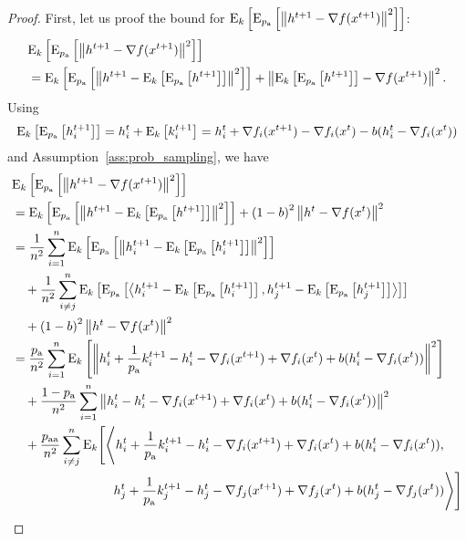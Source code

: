 \documentclass{article}
\newcommand*{\probavailable}{\ensuremath{p_{\textnormal{a}}}}
\newcommand*{\probpairaa}{\ensuremath{p_{\textnormal{aa}}}}
\begin{document}
\begin{proof}
  First, let us proof the bound for $\ExpSub{k}{\ExpSub{\probavailable}{\norm{h^{t+1} - \nabla f(x^{t+1})}^2}}$:
  \begin{align*}
      &\ExpSub{k}{\ExpSub{\probavailable}{\norm{h^{t+1} - \nabla f(x^{t+1})}^2}} \\
      &=\ExpSub{k}{\ExpSub{\probavailable}{\norm{h^{t+1} - \ExpSub{k}{\ExpSub{\probavailable}{h^{t+1}}}}^2}} + \norm{\ExpSub{k}{\ExpSub{\probavailable}{h^{t+1}}} - \nabla f(x^{t+1})}^2.
  \end{align*}
  Using
  \begin{align*}
      \ExpSub{k}{\ExpSub{\probavailable}{h^{t+1}_i}} = h^{t}_i + \ExpSub{k}{k^{t+1}_i} = h^{t}_i + \nabla f_i(x^{t+1}) - \nabla f_i(x^{t}) - b(h^t_i - \nabla f_i(x^{t}))
  \end{align*}
  and Assumption~\ref{ass:prob_sampling}, we have
  \begin{align*}
      &\ExpSub{k}{\ExpSub{\probavailable}{\norm{h^{t+1} - \nabla f(x^{t+1})}^2}} \\
      &=\ExpSub{k}{\ExpSub{\probavailable}{\norm{h^{t+1} - \ExpSub{k}{\ExpSub{\probavailable}{h^{t+1}}}}^2}} + \left(1 - b\right)^2 \norm{h^{t} - \nabla f(x^{t})}^2\\
      &=\frac{1}{n^2}\sum_{i=1}^n \ExpSub{k}{\ExpSub{\probavailable}{\norm{h^{t+1}_i - \ExpSub{k}{\ExpSub{\probavailable}{h^{t+1}_i}}}^2}} \\
      &\quad+ \frac{1}{n^2}\sum_{i\neq j}^n \ExpSub{k}{\ExpSub{\probavailable}{\inp{h^{t+1}_i - \ExpSub{k}{\ExpSub{\probavailable}{h^{t+1}_i}}}{h^{t+1}_j - \ExpSub{k}{\ExpSub{\probavailable}{h^{t+1}_j}}}}} \\
      &\quad + \left(1 - b\right)^2 \norm{h^{t} - \nabla f(x^{t})}^2 \\
      &=\frac{\probavailable}{n^2}\sum_{i=1}^n \ExpSub{k}{\norm{h^{t}_i + \frac{1}{\probavailable}k^{t+1}_i - h^{t}_i - \nabla f_i(x^{t+1}) + \nabla f_i(x^{t}) + b(h^t_i - \nabla f_i(x^{t}))}^2} \\
      &\quad + \frac{1 - \probavailable}{n^2}\sum_{i=1}^n \norm{h^{t}_i - h^{t}_i - \nabla f_i(x^{t+1}) + \nabla f_i(x^{t}) + b(h^t_i - \nabla f_i(x^{t}))}^2 \\
      &\quad +\frac{\probpairaa}{n^2}\sum_{i \neq j}^n{\rm E}_{k}\Bigg[\Bigg\langle h^{t}_i + \frac{1}{\probavailable}k^{t+1}_i - h^{t}_i - \nabla f_i(x^{t+1}) + \nabla f_i(x^{t}) + b(h^t_i - \nabla f_i(x^{t})), \\
      &\qquad\qquad\qquad\qquad h^{t}_j + \frac{1}{\probavailable}k^{t+1}_j - h^{t}_j - \nabla f_j(x^{t+1}) + \nabla f_j(x^{t}) + b(h^t_j - \nabla f_j(x^{t}))\Bigg\rangle\Bigg] \\

\end{align*}
\end{proof}
\end{document}
